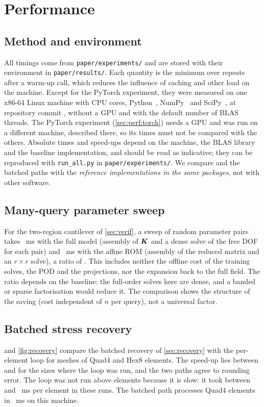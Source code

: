 \section{Performance}\label{sec:perf}

\subsection{Method and environment}
All timings come from \texttt{paper/experiments/} and are stored with their environment in \texttt{paper/results/}. Each quantity is the minimum over repeats after a warm-up call, which reduces the influence of caching and other load on the machine.
Except for the PyTorch experiment, they were measured on one x86-64 Linux machine with \envCpus{} CPU cores, Python~\envPython{}, NumPy~\envNumpy{} and SciPy~\envScipy{}, at repository commit \texttt{\envCommit{}}, without a GPU and with the default number of BLAS threads. The PyTorch experiment (\cref{sec:perf:torch}) needs a GPU and was run on a different machine, described there, so its times must not be compared with the others.
Absolute times and speed-ups depend on the machine, the BLAS library and the baseline implementation, and should be read as indicative; they can be reproduced with \texttt{run\_all.py} in \texttt{paper/experiments/}.
We compare \rom{} and the batched paths with the \emph{reference implementations in the same packages}, not with other software.

\subsection{Many-query parameter sweep}
For the two-region cantilever of \cref{sec:verif}, a sweep of \eOneSweep{} random parameter pairs takes \eOneTfom{}~ms with the full model (assembly of $\bm{K}$ and a dense solve of the free DOF for each pair) and \eOneTrom{}~ms with the affine ROM (assembly of the reduced matrix and an $r\times r$ solve), a ratio of \eOneSpeedup{}. This includes neither the offline cost of the training solves, the POD and the projections, nor the expansion back to the full field.
The ratio depends on the baseline: the full-order solves here are dense, and a banded or sparse factorisation would reduce it. The comparison shows the structure of the saving (cost independent of $n$ per query), not a universal factor.

\subsection{Batched stress recovery}
 and \cref{fig:recovery} compare the batched recovery of \cref{sec:recovery} with the per-element loop for meshes of Quad4 and Hex8 elements. The speed-up lies between \recoveryMinSpeedup{} and \recoveryMaxSpeedup{} for the sizes where the loop was run, and the two paths agree to rounding error.
The loop was not run above \recoveryLoopMax{} elements because it is slow: it took between \recoveryLoopMsMin{} and \recoveryLoopMsMax{}~ms per element in these runs. The batched path processes \recoveryBigElements{} Quad4 elements in \recoveryBigMs{}~ms on this machine.

